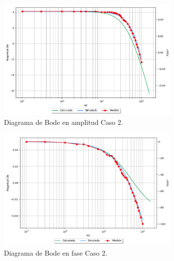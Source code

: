 \begin{figure}[H]	
	\centering
	\includegraphics[width=0.8\textwidth, trim = {0 0 2cm 0},clip]{Ejercicio1/Imagenes/BodeC2_noinv.png}
	\caption{Diagrama de Bode en amplitud Caso 2.}
	\label{fig:BodeC2_noinv}
\end{figure} 
\begin{figure}[H]	
	\centering
	\includegraphics[width=0.8\textwidth, trim = {2.2cm 0 0 0},clip]{Ejercicio1/Imagenes/BodephC2_noinv.png}
	\caption{Diagrama de Bode en fase Caso 2.}
	\label{fig:BodephC2_noinv}
\end{figure} 

